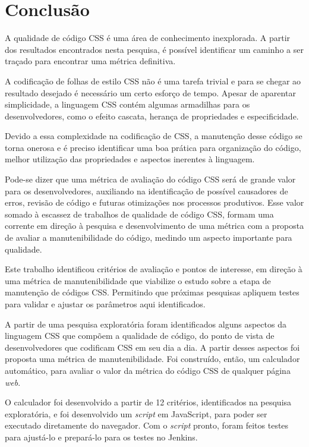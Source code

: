 %
%

\chapter{Conclusão}

A qualidade de código CSS é uma área de conhecimento inexplorada. A partir dos resultados encontrados nesta pesquisa, é possível identificar um caminho a ser traçado para encontrar uma métrica definitiva.

A codificação de folhas de estilo CSS não é uma tarefa trivial e para se chegar ao resultado desejado é necessário um certo esforço de tempo. Apesar de aparentar simplicidade, a linguagem CSS contém algumas armadilhas para os desenvolvedores, como o efeito cascata, herança de propriedades e especificidade.

Devido a essa complexidade na codificação de CSS, a manutenção desse código se torna onerosa e é preciso identificar uma boa prática para organização do código, melhor utilização das propriedades e aspectos inerentes à linguagem.

Pode-se dizer que uma métrica de avaliação do código CSS será de grande valor para os desenvolvedores, auxiliando na identificação de possível causadores de erros, revisão de código e futuras otimizações nos processos produtivos. Esse valor somado à escassez de trabalhos de qualidade de código CSS, formam uma corrente em direção à pesquisa e desenvolvimento de uma métrica com a proposta de avaliar a manutenibilidade do código, medindo um aspecto importante para qualidade.

Este trabalho identificou critérios de avaliação e pontos de interesse, em direção à uma métrica de manutenibilidade que viabilize o estudo sobre a etapa de manutenção de códigos CSS. Permitindo que próximas pesquisas apliquem testes para validar e ajustar os parâmetros aqui identificados.

A partir de uma pesquisa exploratória foram identificados alguns aspectos da linguagem CSS que compõem a qualidade de código, do ponto de vista de desenvolvedores que codificam CSS em seu dia a dia. A partir desses aspectos foi proposta uma métrica de manutenibilidade. Foi construído, então, um calculador automático, para avaliar o valor da métrica do código CSS de qualquer página \textit{web}.

O calculador foi desenvolvido a partir de 12 critérios, identificados na pesquisa exploratória, e foi desenvolvido um \textit{script} em JavaScript, para poder ser executado diretamente do navegador. Com o \textit{script} pronto, foram feitos testes para ajustá-lo e prepará-lo para os testes no Jenkins.

